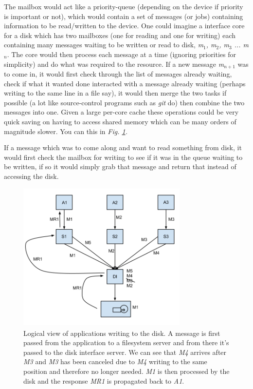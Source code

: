 \documentclass[journal]{IEEEtran}
\begin{document}
The mailbox would act like a priority-queue (depending on the device if priority is important or not), which would contain a set of messages (or jobs) containing information to be read/written to the device. One could imagine a interface core for a disk which has two mailboxes (one for reading and one for writing) each containing many messages waiting to be written or read to disk, \emph{m$_{1}$, m$_{2}$, m$_{3}$ ... m$_{n}$}. The core would then process each message at a time (ignoring priorities for simplicity) and do what was required to the resource. If a new message \emph{m$_{n+1}$} was to come in, it would first check through the list of messages already waiting, check if what it wanted done interacted with a message already waiting (perhaps writing to the same line in a file say), it would then merge the two tasks if possible (a lot like source-control programs such as \emph{git} do) then combine the two messages into one. Given a large per-core cache these operations could be very quick saving on having to access shared memory which can be many orders of magnitude slower. You can this in \emph{Fig. \ref{MessageToDisk}.}

If a message which was to come along and want to read something from disk, it would first check the mailbox for writing to see if it was in the queue waiting to be written, if so it would simply grab that message and return that instead of accessing the disk.

\begin{figure}
\includegraphics[height = 7.5cm, width=8.5cm]{MessagetoDisk.png}
\caption{Logical view of applications writing to the disk. A message is first passed from the application to a filesystem server and from there it's passed to the disk interface server. We can see that \emph{M4} arrives after \emph{M3} and \emph{M3} has been canceled due to \emph{M4} writing to the same position and therefore no longer needed. \emph{M1} is then processed by the disk and the response \emph{MR1} is propagated back to \emph{A1}.}
\label{MessageToDisk}
\end{figure}
\end{document}
